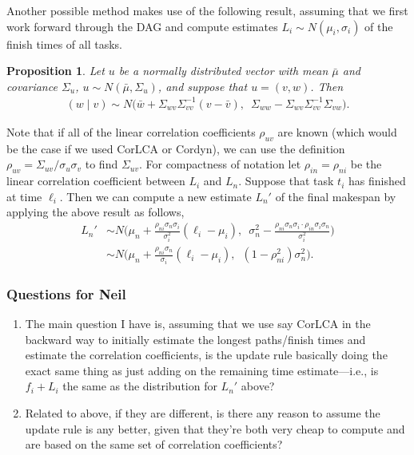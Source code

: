 \documentclass[12pt]{article}
\newtheorem{prop}[theorem]{Proposition}
\begin{document}
Another possible method makes use of the following result, assuming that we first work forward through the DAG and compute estimates $L_i \sim N(\mu_i, \sigma_i)$ of the finish times of all tasks.
\begin{prop}
	Let $u$ be a normally distributed vector with mean $\bar{\mu}$ and covariance $\Sigma_u$, $u \sim N(\bar{\mu}, \Sigma_u)$, and suppose that $u = (v, w)$. Then 
	\begin{align*}
	(w \mid v) \sim N \big( \bar{w} + \Sigma_{wv}\Sigma_{vv}^{-1} (v - \bar{v}), \enspace  \Sigma_{ww} - \Sigma_{wv} \Sigma_{vv}^{-1} \Sigma_{vw} \big).
	\end{align*}
\end{prop}
Note that if all of the linear correlation coefficients $\rho_{uv}$ are known (which would be the case if we used CorLCA or Cordyn), we can use the definition $\rho_{uv} = \Sigma_{uv} / \sigma_u \sigma_v$ to find $\Sigma_{uv}$. For compactness of notation let $\rho_{in} = \rho_{ni}$ be the linear correlation coefficient between $L_i$ and $L_n$. Suppose that task $t_i$ has finished at time $\ell_i$. Then we can compute a new estimate $L_n'$ of the final makespan by applying the above result as follows,
\begin{align*}
L_n' &\sim N \bigg( \mu_{n} + \frac{\rho_{ni} \sigma_{n} \sigma_{i}}{\sigma_{i}^2} (\ell_i - \mu_{i}), \enspace \sigma_{n}^2 - \frac{\rho_{ni} \sigma_{n} \sigma_{i} \cdot \rho_{in} \sigma_{i} \sigma_{n}}{\sigma_{i}^2} \bigg) \nonumber\\
&\sim N \bigg(\mu_{n} + \frac{\rho_{ni} \sigma_{n}}{\sigma_{i}} (\ell_i - \mu_{i}), \enspace (1 - \rho_{ni}^2) \sigma_{n}^2 \bigg).
\end{align*} 

\subsubsection*{Questions for Neil}

\begin{enumerate}
\item The main question I have is, assuming that we use say CorLCA in the backward way to initially estimate the longest paths/finish times and estimate the correlation coefficients, is the update rule basically doing the exact same thing as just adding on the remaining time estimate---i.e., is $f_i + L_i$ the same as the distribution for $L_n'$ above?  
  \item Related to above, if they are different, is there any reason to assume the update rule is any better, given that they're both very cheap to compute and are based on the same set of correlation coefficients? 
  \end{enumerate}
\end{document}
